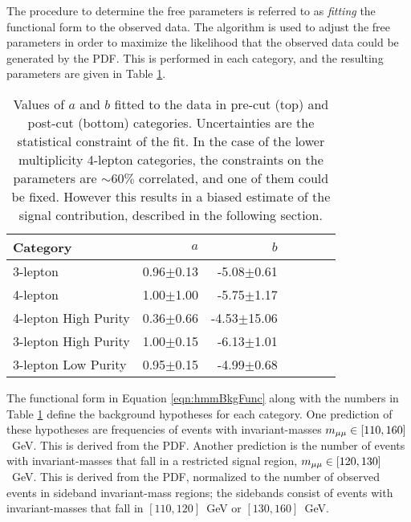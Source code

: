 The procedure to determine the free parameters is referred to as \emph{fitting} the functional form to the observed data.
The  algorithm is used to adjust the free parameters in order to maximize the likelihood that the observed data could be generated by the PDF.
This is performed in each category, and the resulting parameters are given in Table \ref{tab:hmmBkgFitParams}.

\begin{table}[htp]
\begin{center}
\begin{tabular}{l r r r r r r}
\toprule
Category & $a$ & $b$ \\
\midrule
3-lepton & 0.96$\pm$0.13 & -5.08$\pm$0.61 \\
4-lepton & 1.00$\pm$1.00 & -5.75$\pm$1.17 \\
\midrule
4-lepton High Purity & 0.36$\pm$0.66 & -4.53$\pm$15.06 \\
3-lepton High Purity & 1.00$\pm$0.15 & -6.13$\pm$1.01 \\
3-lepton Low Purity  & 0.95$\pm$0.15 & -4.99$\pm$0.68 \\
\bottomrule
\end{tabular}
\caption{Values of $a$ and $b$ fitted to the data in pre-cut (top) and post-cut (bottom) categories. Uncertainties are the statistical constraint of the fit. In the case of the lower multiplicity 4-lepton categories, the constraints on the parameters are $\sim60\%$ correlated, and one of them could be fixed. However this results in a biased estimate of the signal contribution, described in the following section.}
\label{tab:hmmBkgFitParams}
\end{center}
\end{table}

The functional form in Equation \ref{eqn:hmmBkgFunc} along with the numbers in Table \ref{tab:hmmBkgFitParams} define the background hypotheses for each category.
One prediction of these hypotheses are frequencies of events with invariant-masses $m_{\mu\mu}\in[110,160]$~GeV.
This is derived from the PDF.
Another prediction is the number of events with invariant-masses that fall in a restricted signal region, $m_{\mu\mu}\in[120,130]$~GeV.
This is derived from the PDF, normalized to the number of observed events in sideband invariant-mass regions; the sidebands consist of events with invariant-masses that fall in $[110,120]$~GeV or $[130,160]$~GeV.
